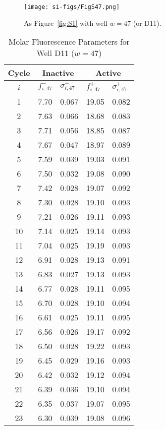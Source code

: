                 \begin{figure}
                    \centering
                    \texttt{[image: si-figs/FigS47.png]}
                    \caption{
                        As Figure~\ref{fig:S1} with well $w=47$ (or D11).
                    }
                \end{figure}
                \clearpage
    \begin{table}
        \caption{Molar Fluorescence Parameters for Well D11 ($w=47$)}
        \centering
        \begin{tabular}{c|ll|ll}
            Cycle & \multicolumn{2}{c|}{Inactive} & \multicolumn{2}{c}{Active} \\
            \hline
            $i$ & $f_{i,47}^{-}$ & $\sigma_{i,47}^{-}$ &  $f_{i,47}^{+}$ & $\sigma_{i,47}^{+}$ \\
            \hline
    1 & 7.70 & 0.067 & 19.05 & 0.082 \\
2 & 7.63 & 0.066 & 18.68 & 0.083 \\
3 & 7.71 & 0.056 & 18.85 & 0.087 \\
4 & 7.67 & 0.047 & 18.97 & 0.089 \\
5 & 7.59 & 0.039 & 19.03 & 0.091 \\
6 & 7.50 & 0.032 & 19.08 & 0.090 \\
7 & 7.42 & 0.028 & 19.07 & 0.092 \\
8 & 7.30 & 0.028 & 19.10 & 0.093 \\
9 & 7.21 & 0.026 & 19.11 & 0.093 \\
10 & 7.14 & 0.025 & 19.14 & 0.093 \\
11 & 7.04 & 0.025 & 19.19 & 0.093 \\
12 & 6.91 & 0.028 & 19.13 & 0.091 \\
13 & 6.83 & 0.027 & 19.13 & 0.093 \\
14 & 6.77 & 0.028 & 19.11 & 0.095 \\
15 & 6.70 & 0.028 & 19.10 & 0.094 \\
16 & 6.61 & 0.025 & 19.11 & 0.095 \\
17 & 6.56 & 0.026 & 19.17 & 0.092 \\
18 & 6.50 & 0.028 & 19.22 & 0.093 \\
19 & 6.45 & 0.029 & 19.16 & 0.093 \\
20 & 6.42 & 0.032 & 19.12 & 0.094 \\
21 & 6.39 & 0.036 & 19.10 & 0.094 \\
22 & 6.35 & 0.037 & 19.07 & 0.095 \\
23 & 6.30 & 0.039 & 19.08 & 0.096 \\

\end{tabular}
\end{table}
